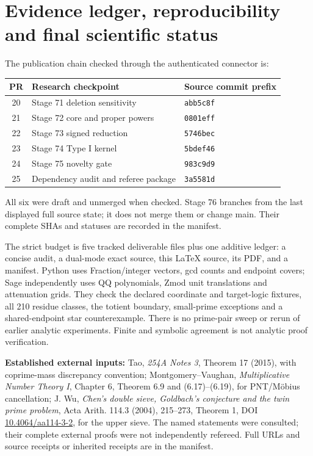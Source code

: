 \documentclass[11pt,a4paper]{article}
\begin{document}
\section{Evidence ledger, reproducibility and final scientific status}
The publication chain checked through the authenticated connector is:
\begin{center}\begin{tabular}{cll}\toprule
PR & Research checkpoint & Source commit prefix\\\midrule
20 & Stage 71 deletion sensitivity & \texttt{abb5c8f}\\
21 & Stage 72 core and proper powers & \texttt{0801eff}\\
22 & Stage 73 signed reduction & \texttt{5746bec}\\
23 & Stage 74 Type I kernel & \texttt{5bdef46}\\
24 & Stage 75 novelty gate & \texttt{983c9d9}\\
25 & Dependency audit and referee package & \texttt{3a5581d}\\\bottomrule
\end{tabular}\end{center}
All six were draft and unmerged when checked. Stage 76 branches from the last displayed full source state; it does not merge them or change main. Their complete SHAs and statuses are recorded in the manifest.

The strict budget is five tracked deliverable files plus one additive ledger: a concise audit, a dual-mode exact source, this LaTeX source, its PDF, and a manifest. Python uses Fraction/integer vectors, gcd counts and endpoint covers; Sage independently uses QQ polynomials, Zmod unit translations and attenuation grids. They check the declared coordinate and target-logic fixtures, all 210 residue classes, the totient boundary, small-prime exceptions and a shared-endpoint star counterexample. There is no prime-pair sweep or rerun of earlier analytic experiments. Finite and symbolic agreement is not analytic proof verification.

\textbf{Established external inputs:} Tao, \emph{254A Notes 3}, Theorem 17 (2015), with coprime-mass discrepancy convention; Montgomery--Vaughan, \emph{Multiplicative Number Theory I}, Chapter 6, Theorem 6.9 and (6.17)--(6.19), for PNT/M\"obius cancellation; J. Wu, \emph{Chen's double sieve, Goldbach's conjecture and the twin prime problem}, Acta Arith. 114.3 (2004), 215--273, Theorem 1, DOI \href{https://doi.org/10.4064/aa114-3-2}{10.4064/aa114-3-2}, for the upper sieve. The named statements were consulted; their complete external proofs were not independently refereed. Full URLs and source receipts or inherited receipts are in the manifest.
\end{document}
